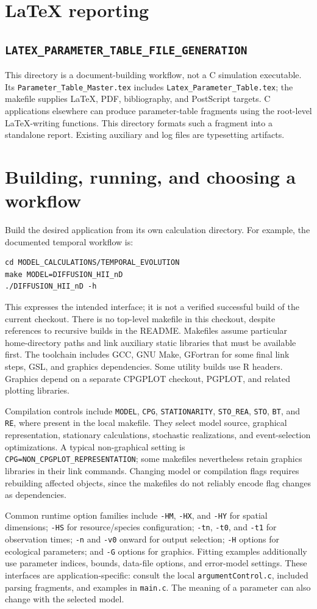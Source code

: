 \documentclass[11pt,a4paper]{article}
\DeclareRobustCommand{\code}[1]{\nolinkurl{#1}}
\newcommand{\program}[1]{\subsection{\texorpdfstring{\code{#1}}{\detokenize{#1}}}}
\begin{document}
\section{LaTeX reporting}
\program{LATEX_PARAMETER_TABLE_FILE_GENERATION}
This directory is a document-building workflow, not a C simulation executable. Its \code{Parameter_Table_Master.tex} includes \code{Latex_Parameter_Table.tex}; the makefile supplies LaTeX, PDF, bibliography, and PostScript targets. C applications elsewhere can produce parameter-table fragments using the root-level LaTeX-writing functions. This directory formats such a fragment into a standalone report. Existing auxiliary and log files are typesetting artifacts.

\section{Building, running, and choosing a workflow}
Build the desired application from its own calculation directory. For example, the documented temporal workflow is:
\begin{verbatim}
cd MODEL_CALCULATIONS/TEMPORAL_EVOLUTION
make MODEL=DIFFUSION_HII_nD
./DIFFUSION_HII_nD -h
\end{verbatim}
This expresses the intended interface; it is not a verified successful build of the current checkout. There is no top-level makefile in this checkout, despite references to recursive builds in the README. Makefiles assume particular home-directory paths and link auxiliary static libraries that must be available first. The toolchain includes GCC, GNU Make, GFortran for some final link steps, GSL, and graphics dependencies. Some utility builds use R headers. Graphics depend on a separate CPGPLOT checkout, PGPLOT, and related plotting libraries.

Compilation controls include \code{MODEL}, \code{CPG}, \code{STATIONARITY}, \code{STO_REA}, \code{STO}, \code{BT}, and \code{RE}, where present in the local makefile. They select model source, graphical representation, stationary calculations, stochastic realizations, and event-selection optimizations. A typical non-graphical setting is \code{CPG=NON_CPGPLOT_REPRESENTATION}; some makefiles nevertheless retain graphics libraries in their link commands. Changing model or compilation flags requires rebuilding affected objects, since the makefiles do not reliably encode flag changes as dependencies.

Common runtime option families include \code{-HM}, \code{-HX}, and \code{-HY} for spatial dimensions; \code{-HS} for resource/species configuration; \code{-tn}, \code{-t0}, and \code{-t1} for observation times; \code{-n} and \code{-v0} onward for output selection; \code{-H} options for ecological parameters; and \code{-G} options for graphics. Fitting examples additionally use parameter indices, bounds, data-file options, and error-model settings. These interfaces are application-specific: consult the local \code{argumentControl.c}, included parsing fragments, and examples in \code{main.c}. The meaning of a parameter can also change with the selected model.
\end{document}
